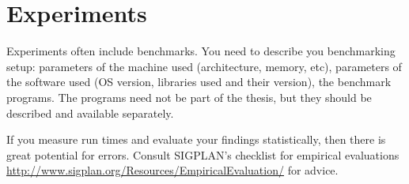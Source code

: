 \chapter{Experiments}\label{chap:experiments}

Experiments often include benchmarks.
You need to describe you benchmarking setup: parameters of the machine used (architecture, memory, etc), parameters of the software used (OS version, libraries used and their version), the benchmark programs.
The programs need not be part of the thesis, but they should be described and available separately.

If you measure run times and evaluate your findings statistically, then there is great potential for errors.
Consult SIGPLAN's checklist for empirical evaluations \url{http://www.sigplan.org/Resources/EmpiricalEvaluation/} for advice. 


